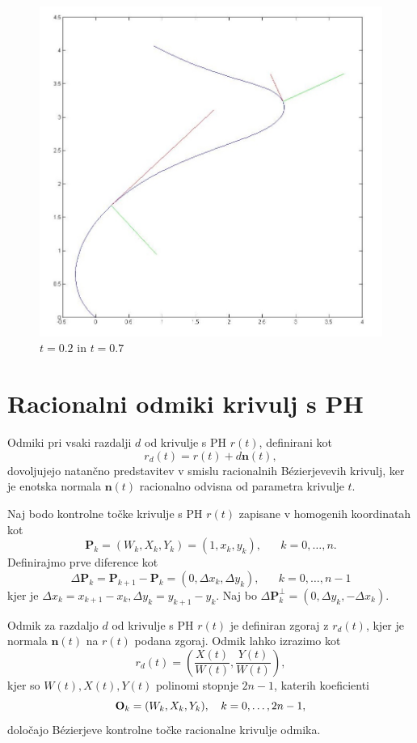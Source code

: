 \documentclass[a4paper]{IEEEtran}
\begin{document}
\begin{center}
	\begin{figure}[h]
		
		\includegraphics[width=0.7\linewidth]{tan-norm.jpg}
		\caption{$t = 0.2$ in $t = 0.7$}
		\label{fig:tan-norm}
	\end{figure}
\end{center}

	\section{Racionalni odmiki krivulj s PH}
	Odmiki pri vsaki razdalji $d$ od krivulje s PH $r (t)$, definirani kot
	$$r_d (t) = r (t) + d \textbf{n} (t),$$
	dovoljujejo natančno predstavitev v smislu racionalnih B\'ezierjevevih krivulj, ker je enotska normala $\textbf{n} (t)$ racionalno odvisna od parametra krivulje $t$. 
	
	Naj bodo kontrolne točke krivulje s PH $r (t)$ zapisane v homogenih koordinatah kot
	$$\textbf{P}_k = (W_k, X_k, Y_k) = (1, x_k, y_k),\hspace{20pt} k = 0,\ldots , n.$$
	Definirajmo prve diference kot
	$$\Delta\textbf{P}_k = \textbf{P}_{k + 1} - \textbf{P}_k = (0, \Delta x_k, \Delta y_k),\hspace{20pt} k = 0,\ldots, n - 1$$
	kjer je $\Delta x_k = x_{k + 1}- x_k, \Delta y_k = y_{k + 1}- y_k$. Naj bo $\Delta\textbf{P}_k^\perp = (0, \Delta y_k, -\Delta x_k).$
	
	Odmik za razdaljo $d$ od krivulje s PH $r (t)$ je definiran zgoraj z $r_d(t)$, kjer je normala $\textbf{n}(t)$ na $r (t)$ podana zgoraj. Odmik lahko izrazimo kot
	$$r_d (t) = \left(\frac{X (t)}{W(t)},\frac{Y(t)}{W(t)}\right),$$
	kjer so $W (t), X (t), Y (t)$ polinomi stopnje $2n - 1$, katerih koeficienti
	$$\textbf{O}_k = (W_k, X_k, Y_k), \hspace{10px} k = 0,\ldots , 2n - 1,$$
	določajo B\'ezierjeve kontrolne točke racionalne krivulje odmika.
	
\end{document}
